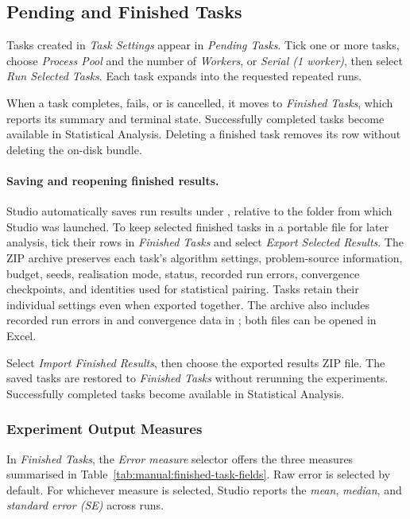 \documentclass[journal,onecolumn]{IEEEtran}
\begin{document}
\subsection{Pending and Finished Tasks}
\label{ssec:manual:experimental-task-execution}

Tasks created in \emph{Task Settings} appear in \emph{Pending Tasks}. Tick one or more tasks, choose \emph{Process Pool} and the number of \emph{Workers}, or \emph{Serial (1 worker)}, then select \emph{Run Selected Tasks}. Each task expands into the requested repeated runs.

When a task completes, fails, or is cancelled, it moves to \emph{Finished Tasks}, which reports its summary and terminal state. Successfully completed tasks become available in Statistical Analysis. Deleting a finished task removes its row without deleting the on-disk bundle.

\paragraph{Saving and reopening finished results.}
Studio automatically saves run results under , relative to the folder from which Studio was launched. To keep selected finished tasks in a portable file for later analysis, tick their rows in \emph{Finished Tasks} and select \emph{Export Selected Results}. The ZIP archive preserves each task's algorithm settings, problem-source information, budget, seeds, realisation mode, status, recorded run errors, convergence checkpoints, and identities used for statistical pairing. Tasks retain their individual settings even when exported together. The archive also includes recorded run errors in  and convergence data in ; both files can be opened in Excel.

Select \emph{Import Finished Results}, then choose the exported results ZIP file. The saved tasks are restored to \emph{Finished Tasks} without rerunning the experiments. Successfully completed tasks become available in Statistical Analysis.

\subsubsection{Experiment Output Measures}
\label{sssec:manual:experimental-output-measures}

In \emph{Finished Tasks}, the \emph{Error measure} selector offers the three measures summarised in Table~\ref{tab:manual:finished-task-fields}. Raw error is selected by default. For whichever measure is selected, Studio reports the \emph{mean}, \emph{median}, and \emph{standard error (SE)} across runs.
\end{document}
